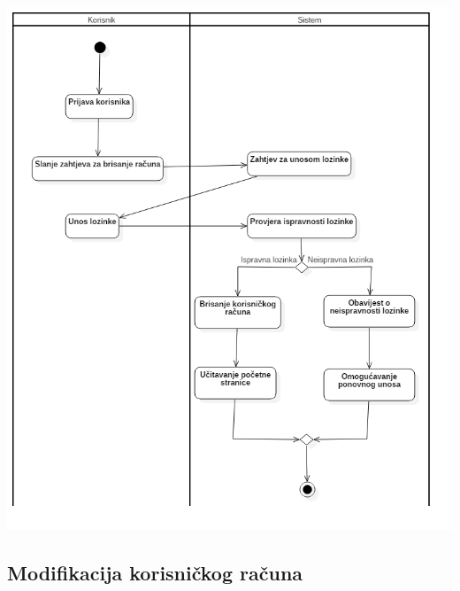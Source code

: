 \begin{center}
    \includegraphics[scale=0.6]{images/BrisanjeKorisnickogRacuna.png}
\end{center}

\subsection{Modifikacija korisničkog računa}


